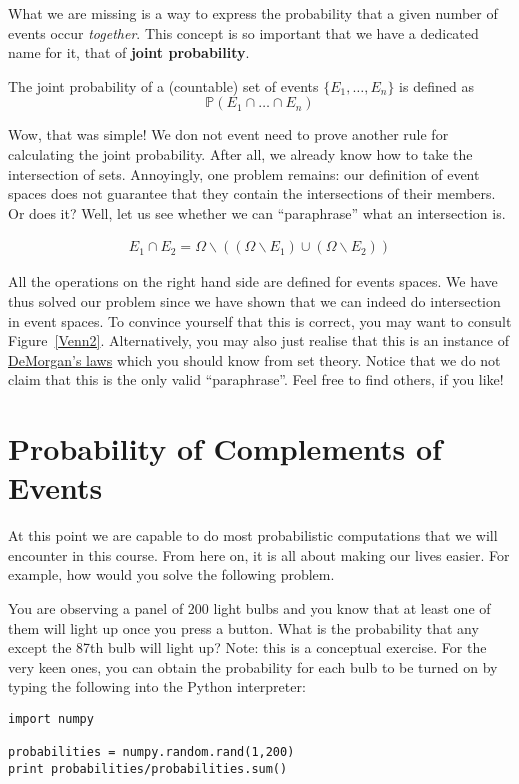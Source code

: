 What we are missing is a way to express the probability that a given number of events occur 
\textit{together}. This concept is so important that we have a dedicated name for it, that of 
\textbf{joint probability}.

\begin{Definition}
The joint probability of a (countable) set of events $ \{E_{1}, \ldots, E_{n}\} $ is defined as
$$ \mathbb{P}(E_{1} \cap \ldots \cap E_{n}) $$
\end{Definition}

Wow, that was simple! We don not event need to prove another rule for calculating the joint probability.
After all, we already know how to take the intersection of sets. Annoyingly, one problem remains: our
definition of event spaces does not guarantee that they contain the intersections of their members. Or does 
it? Well, let us see whether we can ``paraphrase'' what an intersection is.

\begin{align}
E_{1} \cap E_{2} = \Omega \backslash ((\Omega \backslash E_{1}) \cup (\Omega \backslash E_{2}))
\end{align}

All the operations on the right hand side are defined for events spaces. We have thus solved our problem since
we have shown that we can indeed do intersection in event spaces.
To convince yourself that this is correct, you may want to consult Figure~\ref{Venn2}. Alternatively, you
may also just realise that this is an instance of \href{https://en.wikipedia.org/wiki/De_Morgan's_laws}
{DeMorgan's laws} which you should know from set theory. Notice that we do not claim that this is the only 
valid ``paraphrase''. Feel free to find others, if you like!




\section{Probability of Complements of Events}
At this point we are capable to do most probabilistic computations that we will encounter in this course.
From here on, it is all about making our lives easier. For example, how would you solve the following 
problem.

\begin{Exercise}
You are observing a panel of 200 light bulbs and you know that at least one of them will light up once you 
press a button. What is the probability that any except the 87th bulb will light up? Note: this is a 
conceptual exercise. For the very keen ones, you can obtain the probability for each bulb to be turned on
by typing the following into the Python interpreter:

\begin{lstlisting}
import numpy

probabilities = numpy.random.rand(1,200)
print probabilities/probabilities.sum()
\end{lstlisting} 
\end{Exercise}

